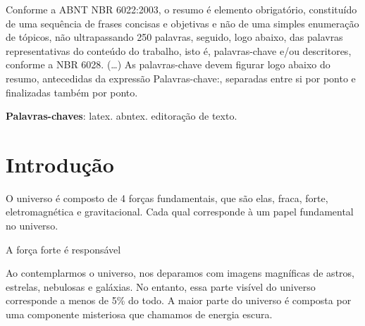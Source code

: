 \documentclass[
	article,			%
	11pt,				%
	oneside,			%
	a4paper,			%
	english,			%
	brazil,				%
	sumario=tradicional
	]{abntex2}
\begin{document}
\frenchspacing 


%
%
\maketitle

\begin{resumoumacoluna}
 Conforme a ABNT NBR 6022:2003, o resumo é elemento obrigatório, constituído de
 uma sequência de frases concisas e objetivas e não de uma simples enumeração
 de tópicos, não ultrapassando 250 palavras, seguido, logo abaixo, das palavras
 representativas do conteúdo do trabalho, isto é, palavras-chave e/ou
 descritores, conforme a NBR 6028. (\ldots) As palavras-chave devem figurar logo
 abaixo do resumo, antecedidas da expressão Palavras-chave:, separadas entre si por
 ponto e finalizadas também por ponto.
 
 \vspace{\onelineskip}
 
 \noindent
 \textbf{Palavras-chaves}: latex. abntex. editoração de texto.
\end{resumoumacoluna}


\textual

\section*{Introdução}
O universo é composto de 4 forças fundamentais, que são elas, fraca, forte, eletromagnética e gravitacional. Cada qual 
corresponde à um papel fundamental no universo. 

A força forte é responsável 


Ao contemplarmos o universo, nos deparamos com imagens magníficas de astros, estrelas, nebulosas e galáxias. No entanto, essa parte visível do universo corresponde a menos de 5\% do todo. A maior parte do universo é composta por uma componente misteriosa que chamamos de energia escura.
\end{document}
